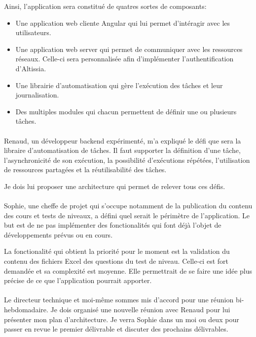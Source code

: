     Ainsi, l'application sera constitué de quatres sortes de composants:
    \begin{itemize}
        \item Une application web cliente Angular qui lui permet d'intéragir avec les utilisateurs.
        \item Une application web server qui permet de communiquer avec les ressources réseaux.
        Celle-ci sera personnalisée afin d'implémenter l'authentification d'Altissia.
        \item Une librairie d'automatisation qui gère l'exécution des tâches et leur journalisation.
        \item Des multiples modules qui chacun permettent de définir une ou plusieurs tâches.
    \end{itemize}

    \paragraph{}
    Renaud, un développeur backend expérimenté, m'a expliqué le défi que sera la libraire d'automatisation de tâches.
    Il faut supporter la définition d'une tâche, l'asynchronicité de son exécution, la possibilité d'exécutions répétées,
    l'utilisation de ressources partagées et la réutilisabilité des tâches.

    Je dois lui proposer une architecture qui permet de relever tous ces défis.

    \paragraph{}
    Sophie, une cheffe de projet qui s'occupe notamment de la publication du contenu des cours et tests de niveaux,
    a défini quel serait le périmètre de l'application.
    Le but est de ne pas implémenter des fonctionalités qui font déjà l'objet de développements prévus ou en cours.

    La fonctionalité qui obtient la priorité pour le moment est la validation du contenu des fichiers Excel des questions du test de niveau.
    Celle-ci est fort demandée et sa complexité est moyenne.
    Elle permettrait de se faire une idée plus précise de ce que l'application pourrait apporter.

    \paragraph{}
    Le directeur technique et moi-même sommes mis d'accord pour une réunion bi-hebdomadaire.
    Je dois organisé une nouvelle réunion avec Renaud pour lui présenter mon plan d'architecture.
    Je verra Sophie dans un moi ou deux pour passer en revue le premier délivrable et discuter des prochains délivrables.

